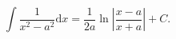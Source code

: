 $$ 
  \int \frac{1}{x^2 - a^2} \mathrm{d}x 
  = \frac{1}{2a} \ln \left | \frac{x-a}{x+a} \right |
  + C . 
  $$